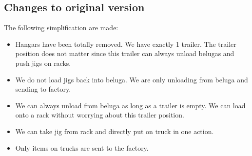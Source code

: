 \documentclass{article}
\begin{document}
\subsection{Changes to original version}
The following simplification are made:
\begin{itemize}
    \item Hangars have been totally removed. We have exactly 1 trailer. The trailer position does not matter since this trailer can always unload belugas and push jigs on racks.

    \item We do not load jigs back into beluga. We are only unloading from beluga and sending to factory.
    
    \item We can always unload from beluga as long as a trailer is empty. We can load onto a rack without worrying about this trailer position.
    
    \item We can take jig from rack and directly put on truck in one action. 
    
    \item Only items on trucks are sent to the factory.
\end{itemize}
\end{document}
